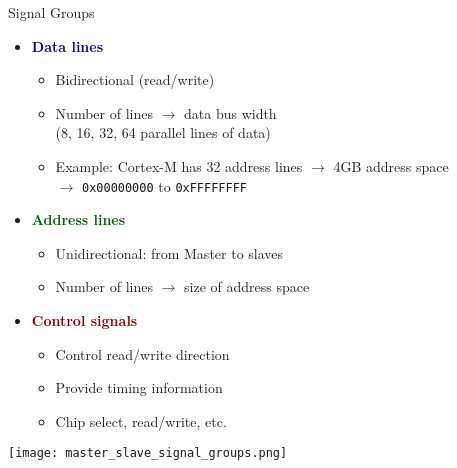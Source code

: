 \begin{theorem}{Signal Groups}
    \begin{itemize}
        \item \textcolor{darkblue}{\textbf{Data lines}}
        \begin{itemize}
            \item Bidirectional (read/write)
            \item Number of lines $\rightarrow$ data bus width \\(8, 16, 32, 64 parallel lines of data)
            \item Example: Cortex-M has 32 address lines $\rightarrow$ 4GB address space \\ $\rightarrow$ \texttt{0x00000000} to \texttt{0xFFFFFFFF}
        \end{itemize}
        \item \textcolor{darkgreen}{\textbf{Address lines}}
        \begin{itemize}
            \item Unidirectional: from Master to slaves
            \item Number of lines $\rightarrow$ size of address space
        \end{itemize}
        \item \textcolor{darkred}{\textbf{Control signals}}
        \begin{itemize}
            \item Control read/write direction
            \item Provide timing information
            \item Chip select, read/write, etc.
        \end{itemize}
    \end{itemize}
    \vspace{2mm}
    \texttt{[image: master\_slave\_signal\_groups.png]}
\end{theorem}

\multend

